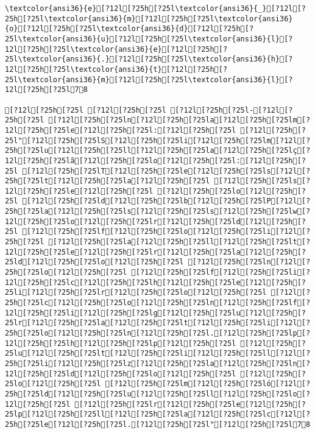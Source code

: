 \documentclass{scrartcl}
\begin{document}
\begin{Verbatim}
\textcolor{ansi36}{e}[?12l[?25h[?25l\textcolor{ansi36}{_}[?12l[?25h[?25l\textcolor{ansi36}{m}[?12l[?25h[?25l\textcolor{ansi36}{o}[?12l[?25h[?25l\textcolor{ansi36}{d}[?12l[?25h[?25l\textcolor{ansi36}{u}[?12l[?25h[?25l\textcolor{ansi36}{l}[?12l[?25h[?25l\textcolor{ansi36}{e}[?12l[?25h[?25l\textcolor{ansi36}{.}[?12l[?25h[?25l\textcolor{ansi36}{h}[?12l[?25h[?25l\textcolor{ansi36}{t}[?12l[?25h[?25l\textcolor{ansi36}{m}[?12l[?25h[?25l\textcolor{ansi36}{l}[?12l[?25h[?25l78

[?12l[?25h[?25l [?12l[?25h[?25l [?12l[?25h[?25l-[?12l[?25h[?25l [?12l[?25h[?25ln[?12l[?25h[?25la[?12l[?25h[?25lm[?12l[?25h[?25le[?12l[?25h[?25l:[?12l[?25h[?25l [?12l[?25h[?25l"[?12l[?25h[?25lS[?12l[?25h[?25li[?12l[?25h[?25lm[?12l[?25h[?25lu[?12l[?25h[?25ll[?12l[?25h[?25la[?12l[?25h[?25lç[?12l[?25h[?25lã[?12l[?25h[?25lo[?12l[?25h[?25l:[?12l[?25h[?25l [?12l[?25h[?25lT[?12l[?25h[?25le[?12l[?25h[?25ls[?12l[?25h[?25lt[?12l[?25h[?25la[?12l[?25h[?25l [?12l[?25h[?25ls[?12l[?25h[?25le[?12l[?25h[?25l [?12l[?25h[?25lo[?12l[?25h[?25l [?12l[?25h[?25ld[?12l[?25h[?25lb[?12l[?25h[?25lP[?12l[?25h[?25la[?12l[?25h[?25ls[?12l[?25h[?25ls[?12l[?25h[?25lw[?12l[?25h[?25lo[?12l[?25h[?25lr[?12l[?25h[?25ld[?12l[?25h[?25l [?12l[?25h[?25lf[?12l[?25h[?25lo[?12l[?25h[?25li[?12l[?25h[?25l [?12l[?25h[?25la[?12l[?25h[?25ll[?12l[?25h[?25lt[?12l[?25h[?25le[?12l[?25h[?25lr[?12l[?25h[?25la[?12l[?25h[?25ld[?12l[?25h[?25lo[?12l[?25h[?25l [?12l[?25h[?25ln[?12l[?25h[?25lo[?12l[?25h[?25l [?12l[?25h[?25lf[?12l[?25h[?25li[?12l[?25h[?25lc[?12l[?25h[?25lh[?12l[?25h[?25le[?12l[?25h[?25li[?12l[?25h[?25lr[?12l[?25h[?25lo[?12l[?25h[?25l [?12l[?25h[?25lc[?12l[?25h[?25lo[?12l[?25h[?25ln[?12l[?25h[?25lf[?12l[?25h[?25li[?12l[?25h[?25lg[?12l[?25h[?25lu[?12l[?25h[?25lr[?12l[?25h[?25la[?12l[?25h[?25lt[?12l[?25h[?25li[?12l[?25h[?25lo[?12l[?25h[?25ln[?12l[?25h[?25l.[?12l[?25h[?25lp[?12l[?25h[?25lh[?12l[?25h[?25lp[?12l[?25h[?25l [?12l[?25h[?25lu[?12l[?25h[?25lt[?12l[?25h[?25li[?12l[?25h[?25ll[?12l[?25h[?25li[?12l[?25h[?25lz[?12l[?25h[?25la[?12l[?25h[?25ln[?12l[?25h[?25ld[?12l[?25h[?25lo[?12l[?25h[?25l [?12l[?25h[?25lo[?12l[?25h[?25l [?12l[?25h[?25lm[?12l[?25h[?25ló[?12l[?25h[?25ld[?12l[?25h[?25lu[?12l[?25h[?25ll[?12l[?25h[?25lo[?12l[?25h[?25l [?12l[?25h[?25lr[?12l[?25h[?25le[?12l[?25h[?25lp[?12l[?25h[?25ll[?12l[?25h[?25la[?12l[?25h[?25lc[?12l[?25h[?25le[?12l[?25h[?25l.[?12l[?25h[?25l"[?12l[?25h[?25l78


\end{Verbatim}
\end{document}
